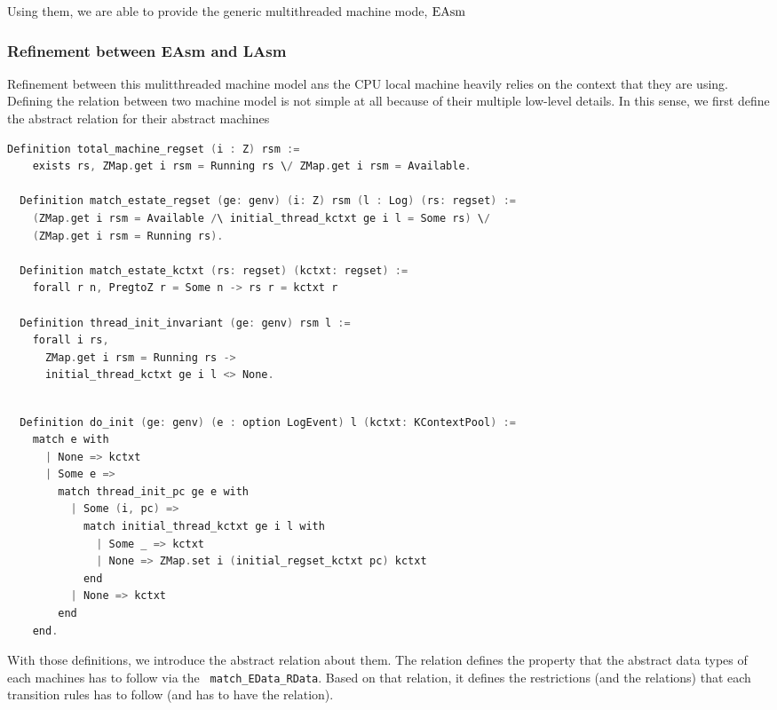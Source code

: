 Using them, we are able to provide the generic multithreaded machine mode, $\mathrm{EAsm}$


\subsubsection{Refinement between EAsm and LAsm}

Refinement between this mulitthreaded machine model ans the CPU local machine heavily relies on
the context that they are using. 
Defining the relation between two machine model is not simple at all 
because of their multiple low-level details. 
In this sense, 
we first define the abstract relation for their abstract machines 


\begin{lstlisting}[language=C]
  Definition total_machine_regset (i : Z) rsm :=
    exists rs, ZMap.get i rsm = Running rs \/ ZMap.get i rsm = Available.

  Definition match_estate_regset (ge: genv) (i: Z) rsm (l : Log) (rs: regset) :=
    (ZMap.get i rsm = Available /\ initial_thread_kctxt ge i l = Some rs) \/
    (ZMap.get i rsm = Running rs).
  
  Definition match_estate_kctxt (rs: regset) (kctxt: regset) :=
    forall r n, PregtoZ r = Some n -> rs r = kctxt r

  Definition thread_init_invariant (ge: genv) rsm l :=
    forall i rs,
      ZMap.get i rsm = Running rs ->
      initial_thread_kctxt ge i l <> None.
\end{lstlisting}


\begin{lstlisting}[language=C]

  Definition do_init (ge: genv) (e : option LogEvent) l (kctxt: KContextPool) :=
    match e with
      | None => kctxt
      | Some e =>
        match thread_init_pc ge e with
          | Some (i, pc) =>
            match initial_thread_kctxt ge i l with
              | Some _ => kctxt
              | None => ZMap.set i (initial_regset_kctxt pc) kctxt
            end
          | None => kctxt
        end
    end.
\end{lstlisting}

With those definitions, we introduce 
the abstract relation about them. 
The relation defines the property that the abstract data types of each machines has to 
follow via the \lstinline$ match_EData_RData$.
Based on that relation,
it defines the restrictions (and the relations)
that each transition rules  has to follow (and has to have the relation). 

